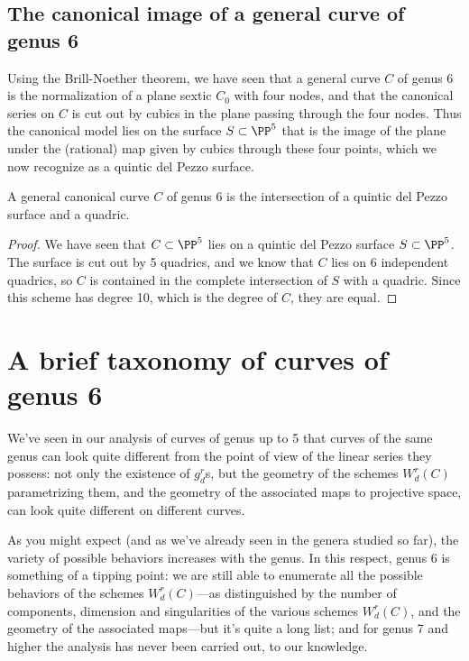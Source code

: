\subsection{The canonical image of a general curve of genus 6}

Using the Brill-Noether theorem, we have seen that a general curve $C$ of genus 6 is the normalization of a plane sextic $C_0$ with four nodes, and that the canonical series on $C$ is cut out by cubics in the plane passing through the four nodes. Thus the canonical model lies on the surface $S \subset \PP^5$ that is the image of the plane under the (rational) map given by cubics through these four points, which we now recognize as a quintic del Pezzo surface.

\begin{theorem}
A general canonical curve $C$ of genus 6 is the intersection of a quintic del Pezzo surface and a quadric. 
\end{theorem}

\begin{proof}
We have seen that $C \subset \PP^5$ lies on a quintic del Pezzo surface $S \subset \PP^5$. The surface is cut out by 5 quadrics, and we know that $C$ lies on 6 independent quadrics,
so $C$ is contained in the complete intersection of $S$ with a quadric. Since this scheme has degree 10, which is the degree of $C$, they are equal.
\end{proof}


\section{A brief taxonomy of curves of genus 6}

We've seen in our analysis of curves of genus up to 5 that curves of the same genus can look quite different from the point of view of the linear series they possess: not only the existence of $g^r_d$s, but the geometry of the schemes $W^r_d(C)$ parametrizing them, and the geometry of the associated maps to projective space, can look quite different on different curves.

As you might expect (and as we've already seen in the genera studied so far), the variety of possible behaviors increases with the genus. In this respect, genus 6 is something of a tipping point: we are still able to enumerate all the possible behaviors of the schemes $W^r_d(C)$---as distinguished by the number of components, dimension and singularities of the various schemes $W^r_d(C)$, and the geometry of the associated maps---but it's quite a long list; and for genus 7 and higher the analysis has never been carried out, to our knowledge.

